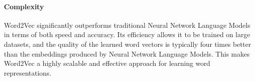 \paragraph*{Complexity}
Word2Vec significantly outperforms traditional Neural Network Language Models in terms of both speed and accuracy. 
Its efficiency allows it to be trained on large datasets, and the quality of the learned word vectors is typically four times better than the embeddings produced by Neural Network Language Models. 
This makes Word2Vec a highly scalable and effective approach for learning word representations.